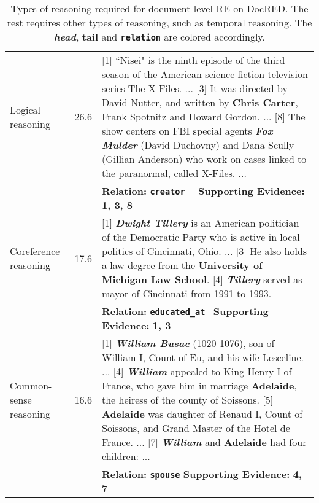 \documentclass[11pt,a4paper]{article}
\begin{document}
\begin{table*}[htbp]
\begin{center}
\begin{tabular}{p{}  r p{}}
    \midrule
    Logical reasoning & 26.6 & {\color{olive}[1] } ``Nisei" is the ninth episode of the third season of the American science fiction television series The X-Files. ... {\color{olive}[3] }It was directed by David Nutter, and written by {\color{blue_h} \textbf{Chris Carter}}, Frank Spotnitz and Howard Gordon. ... {\color{olive}[8] }The show centers on FBI special agents {\color{blue} \textbf{\textit{Fox Mulder}}} (David Duchovny) and Dana Scully (Gillian Anderson) who work on cases linked to the paranormal, called X-Files.  ... \\
    & & \textbf{Relation:} {\color{rel} \textbf{\texttt{creator}}} \qquad \qquad \qquad \qquad \qquad \ \ \textbf{Supporting Evidence:} {\color{olive} \textbf{1, 3, 8}} \\   
    \midrule
    Coreference reasoning & 17.6 &{\color{olive}[1] }{\color{blue} \textbf{\textit{Dwight Tillery}}} is an American politician of the Democratic Party who is active in local politics of Cincinnati, Ohio. ... {\color{olive}[3] }He also holds a law degree from the {\color{blue_h} \textbf{University of Michigan Law School}}. {\color{olive}[4] }{\color{blue} \textbf{\textit{Tillery}}} served as mayor of Cincinnati from 1991 to 1993. \\
    & & \textbf{Relation:} {\color{rel} \texttt{\textbf{educated\_at}}} \ \qquad \qquad \qquad \qquad  \textbf{Supporting Evidence:} {\color{olive} \textbf{1, 3}} \\   
    \midrule
    Common-sense reasoning &16.6  &{\color{olive} [1]} {\color{blue} \textbf{\textit{William Busac}}} (1020-1076), son of William I, Count of Eu, and his wife Lesceline. ... {\color{olive} [4]} {\color{blue} \textbf{\textit{William}}} appealed to King Henry I of France, who gave him in marriage {\color{blue_h}\textbf{Adelaide}}, the heiress of the county of Soissons. {\color{olive} [5]} {\color{blue_h} \textbf{Adelaide}} was daughter of Renaud I, Count of Soissons, and Grand Master of the Hotel de France. ... {\color{olive} [7]} {\color{blue} \textbf{\textit{William}}} and {\color{blue_h} \textbf{Adelaide}} had four children: ... 
    \\
    & & \textbf{Relation:} {\color{rel} \texttt{\textbf{spouse}}} \qquad \qquad \qquad \qquad \qquad \quad   \textbf{Supporting Evidence:} {\color{olive} \textbf{4, 7}} \\     
    
    \bottomrule
    \end{tabular}
    \end{center}
    \caption{Types of reasoning required for document-level RE on DocRED. The rest  requires other types of reasoning, such as temporal reasoning. The {\color{blue}\bf \textit{head}}, {\color{blue_h} \bf tail} and {\color{rel} \bf \texttt{relation}} are colored accordingly.}
\label{Table:reasoning types}
\end{table*}
\end{document}
